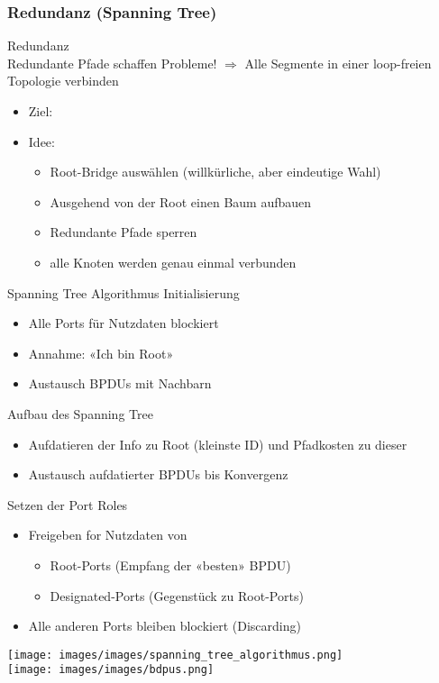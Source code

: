 \columnbreak

\subsubsection{Redundanz (Spanning Tree)}

\begin{concept}{Redundanz}\\
    Redundante Pfade schaffen Probleme! $\Rightarrow$ Alle Segmente in einer loop-freien Topologie verbinden
    \begin{itemize}
        \item Ziel: 
        \item Idee:
        \begin{itemize}
            \item Root-Bridge auswählen (willkürliche, aber eindeutige Wahl) 
            \item Ausgehend von der Root einen Baum aufbauen
            \item Redundante Pfade sperren
            \item alle Knoten werden genau einmal verbunden
        \end{itemize}
    \end{itemize}
\end{concept}

\begin{KR}{Spanning Tree Algorithmus}
    Initialisierung
    \begin{itemize}
        \item Alle Ports für Nutzdaten blockiert
        \item Annahme: «Ich bin Root»
        \item Austausch BPDUs mit Nachbarn
    \end{itemize}
    Aufbau des Spanning Tree
    \begin{itemize}
        \item Aufdatieren der Info zu Root (kleinste ID) und Pfadkosten zu dieser
        \item Austausch aufdatierter BPDUs bis Konvergenz
    \end{itemize}
    Setzen der Port Roles
    \begin{itemize}
        \item Freigeben for Nutzdaten von
        \begin{itemize}
            \item Root-Ports (Empfang der «besten» BPDU)
            \item Designated-Ports (Gegenstück zu Root-Ports)
        \end{itemize}
        \item Alle anderen Ports bleiben blockiert (Discarding)
    \end{itemize}
        \texttt{[image: images/images/spanning\_tree\_algorithmus.png]}\\
        \texttt{[image: images/images/bdpus.png]}
\end{KR}

